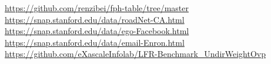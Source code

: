 \documentclass{article}
\begin{document}
\begin{thebibliography}{9}
     \url{https://github.com/renzibei/fph-table/tree/master}
     \url{https://snap.stanford.edu/data/roadNet-CA.html}
     \url{https://snap.stanford.edu/data/ego-Facebook.html}
     \url{https://snap.stanford.edu/data/email-Enron.html}
     \url{https://github.com/eXascaleInfolab/LFR-Benchmark_UndirWeightOvp}
\end{thebibliography}
\end{document}
